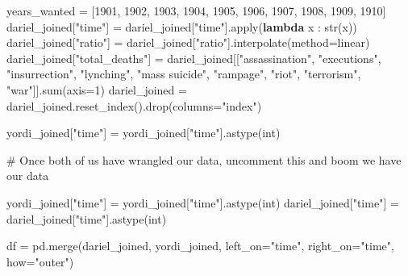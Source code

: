 \documentclass[
  letterpaper,
  DIV=11,
  numbers=noendperiod]{scrartcl}
\newenvironment{Shaded}{\begin{snugshade}}{\end{snugshade}}
\newcommand{\BuiltInTok}[1]{\textcolor[rgb]{0.00,0.23,0.31}{#1}}
\newcommand{\CommentTok}[1]{\textcolor[rgb]{0.37,0.37,0.37}{#1}}
\newcommand{\DecValTok}[1]{\textcolor[rgb]{0.68,0.00,0.00}{#1}}
\newcommand{\KeywordTok}[1]{\textcolor[rgb]{0.00,0.23,0.31}{\textbf{#1}}}
\newcommand{\NormalTok}[1]{\textcolor[rgb]{0.00,0.23,0.31}{#1}}
\newcommand{\OperatorTok}[1]{\textcolor[rgb]{0.37,0.37,0.37}{#1}}
\newcommand{\StringTok}[1]{\textcolor[rgb]{0.13,0.47,0.30}{#1}}
\begin{document}
\begin{Shaded}
\begin{Highlighting}[]
\NormalTok{years\_wanted }\OperatorTok{=}\NormalTok{ [}\DecValTok{1901}\NormalTok{, }\DecValTok{1902}\NormalTok{, }\DecValTok{1903}\NormalTok{, }\DecValTok{1904}\NormalTok{, }\DecValTok{1905}\NormalTok{, }\DecValTok{1906}\NormalTok{, }\DecValTok{1907}\NormalTok{, }\DecValTok{1908}\NormalTok{, }\DecValTok{1909}\NormalTok{, }\DecValTok{1910}\NormalTok{]}
\NormalTok{dariel\_joined[}\StringTok{"time"}\NormalTok{] }\OperatorTok{=}\NormalTok{ dariel\_joined[}\StringTok{"time"}\NormalTok{].}\BuiltInTok{apply}\NormalTok{(}\KeywordTok{lambda}\NormalTok{ x : }\BuiltInTok{str}\NormalTok{(x))}
\NormalTok{dariel\_joined[}\StringTok{"ratio"}\NormalTok{] }\OperatorTok{=}\NormalTok{ dariel\_joined[}\StringTok{"ratio"}\NormalTok{].interpolate(method}\OperatorTok{=}\StringTok{\textquotesingle{}linear\textquotesingle{}}\NormalTok{)}
\NormalTok{dariel\_joined[}\StringTok{"total\_deaths"}\NormalTok{] }\OperatorTok{=}\NormalTok{ dariel\_joined[[}\StringTok{"assassination"}\NormalTok{, }\StringTok{"executions"}\NormalTok{, }\StringTok{"insurrection"}\NormalTok{, }\StringTok{"lynching"}\NormalTok{,}
                                               \StringTok{"mass suicide"}\NormalTok{, }\StringTok{"rampage"}\NormalTok{, }\StringTok{"riot"}\NormalTok{, }\StringTok{"terrorism"}\NormalTok{, }\StringTok{"war"}\NormalTok{]].}\BuiltInTok{sum}\NormalTok{(axis}\OperatorTok{=}\DecValTok{1}\NormalTok{)}
\NormalTok{dariel\_joined }\OperatorTok{=}\NormalTok{ dariel\_joined.reset\_index().drop(columns}\OperatorTok{=}\StringTok{"index"}\NormalTok{)}
\end{Highlighting}
\end{Shaded}

\begin{Shaded}
\begin{Highlighting}[]
\NormalTok{yordi\_joined[}\StringTok{"time"}\NormalTok{] }\OperatorTok{=}\NormalTok{ yordi\_joined[}\StringTok{"time"}\NormalTok{].astype(}\BuiltInTok{int}\NormalTok{)}
\end{Highlighting}
\end{Shaded}

\begin{Shaded}
\begin{Highlighting}[]
\CommentTok{\# Once both of us have wrangled our data, uncomment this and boom we have our data}

\NormalTok{yordi\_joined[}\StringTok{"time"}\NormalTok{] }\OperatorTok{=}\NormalTok{ yordi\_joined[}\StringTok{"time"}\NormalTok{].astype(}\BuiltInTok{int}\NormalTok{)}
\NormalTok{dariel\_joined[}\StringTok{"time"}\NormalTok{] }\OperatorTok{=}\NormalTok{ dariel\_joined[}\StringTok{"time"}\NormalTok{].astype(}\BuiltInTok{int}\NormalTok{)}


\NormalTok{df }\OperatorTok{=}\NormalTok{ pd.merge(dariel\_joined, yordi\_joined, left\_on}\OperatorTok{=}\StringTok{"time"}\NormalTok{, right\_on}\OperatorTok{=}\StringTok{"time"}\NormalTok{, how}\OperatorTok{=}\StringTok{"outer"}\NormalTok{)}
\end{Highlighting}
\end{Shaded}
\end{document}

